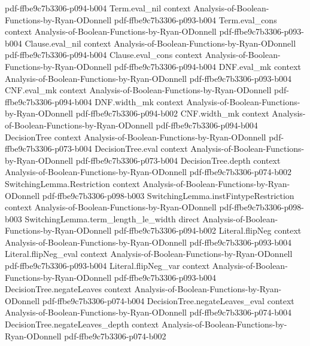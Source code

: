 \begin{lemma}
  {pdf-ffbe9c7b3306-p094-b004}
\proofstep
  {Term.eval_nil}
  {context}
  {Analysis-of-Boolean-Functions-by-Ryan-ODonnell}
  {pdf-ffbe9c7b3306-p093-b004}
\proofstep
  {Term.eval_cons}
  {context}
  {Analysis-of-Boolean-Functions-by-Ryan-ODonnell}
  {pdf-ffbe9c7b3306-p093-b004}
\proofstep
  {Clause.eval_nil}
  {context}
  {Analysis-of-Boolean-Functions-by-Ryan-ODonnell}
  {pdf-ffbe9c7b3306-p094-b004}
\proofstep
  {Clause.eval_cons}
  {context}
  {Analysis-of-Boolean-Functions-by-Ryan-ODonnell}
  {pdf-ffbe9c7b3306-p094-b004}
\proofstep
  {DNF.eval_mk}
  {context}
  {Analysis-of-Boolean-Functions-by-Ryan-ODonnell}
  {pdf-ffbe9c7b3306-p093-b004}
\proofstep
  {CNF.eval_mk}
  {context}
  {Analysis-of-Boolean-Functions-by-Ryan-ODonnell}
  {pdf-ffbe9c7b3306-p094-b004}
\proofstep
  {DNF.width_mk}
  {context}
  {Analysis-of-Boolean-Functions-by-Ryan-ODonnell}
  {pdf-ffbe9c7b3306-p094-b002}
\proofstep
  {CNF.width_mk}
  {context}
  {Analysis-of-Boolean-Functions-by-Ryan-ODonnell}
  {pdf-ffbe9c7b3306-p094-b004}
\proofstep
  {DecisionTree}
  {context}
  {Analysis-of-Boolean-Functions-by-Ryan-ODonnell}
  {pdf-ffbe9c7b3306-p073-b004}
\proofstep
  {DecisionTree.eval}
  {context}
  {Analysis-of-Boolean-Functions-by-Ryan-ODonnell}
  {pdf-ffbe9c7b3306-p073-b004}
\proofstep
  {DecisionTree.depth}
  {context}
  {Analysis-of-Boolean-Functions-by-Ryan-ODonnell}
  {pdf-ffbe9c7b3306-p074-b002}
\proofstep
  {SwitchingLemma.Restriction}
  {context}
  {Analysis-of-Boolean-Functions-by-Ryan-ODonnell}
  {pdf-ffbe9c7b3306-p098-b003}
\proofstep
  {SwitchingLemma.instFintypeRestriction}
  {context}
  {Analysis-of-Boolean-Functions-by-Ryan-ODonnell}
  {pdf-ffbe9c7b3306-p098-b003}
\proofstep
  {SwitchingLemma.term_length_le_width}
  {direct}
  {Analysis-of-Boolean-Functions-by-Ryan-ODonnell}
  {pdf-ffbe9c7b3306-p094-b002}
\proofstep
  {Literal.flipNeg}
  {context}
  {Analysis-of-Boolean-Functions-by-Ryan-ODonnell}
  {pdf-ffbe9c7b3306-p093-b004}
\proofstep
  {Literal.flipNeg_eval}
  {context}
  {Analysis-of-Boolean-Functions-by-Ryan-ODonnell}
  {pdf-ffbe9c7b3306-p093-b004}
\proofstep
  {Literal.flipNeg_var}
  {context}
  {Analysis-of-Boolean-Functions-by-Ryan-ODonnell}
  {pdf-ffbe9c7b3306-p093-b004}
\proofstep
  {DecisionTree.negateLeaves}
  {context}
  {Analysis-of-Boolean-Functions-by-Ryan-ODonnell}
  {pdf-ffbe9c7b3306-p074-b004}
\proofstep
  {DecisionTree.negateLeaves_eval}
  {context}
  {Analysis-of-Boolean-Functions-by-Ryan-ODonnell}
  {pdf-ffbe9c7b3306-p074-b004}
\proofstep
  {DecisionTree.negateLeaves_depth}
  {context}
  {Analysis-of-Boolean-Functions-by-Ryan-ODonnell}
  {pdf-ffbe9c7b3306-p074-b002}

\end{lemma}

